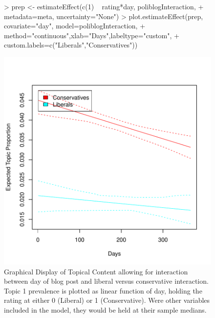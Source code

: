 \documentclass[nojss]{jss}
\begin{document}
\begin{Schunk}
\end{Schunk}

\begin{figure}[t!]
\begin{center}
\begin{Schunk}
\begin{Sinput}
> prep <- estimateEffect(c(1) ~ rating*day, poliblogInteraction,
+         metadata=meta, uncertainty="None")
> plot.estimateEffect(prep, covariate="day", model=poliblogInteraction,
+         method="continuous",xlab="Days",labeltype="custom",
+         custom.labels=c("Liberals","Conservatives"))
\end{Sinput}
\end{Schunk}
\includegraphics{stmVignette-022}
\caption{Graphical Display of Topical Content allowing for interaction between day of blog post and liberal versus conservative interaction. Topic 1 prevalence is plotted as linear function of day, holding the rating at either 0 (Liberal) or 1 (Conservative). Were other variables included in the model, they would be held at their sample medians.}
\label{fig:spline2}
\end{center}
\end{figure}
\end{document}
